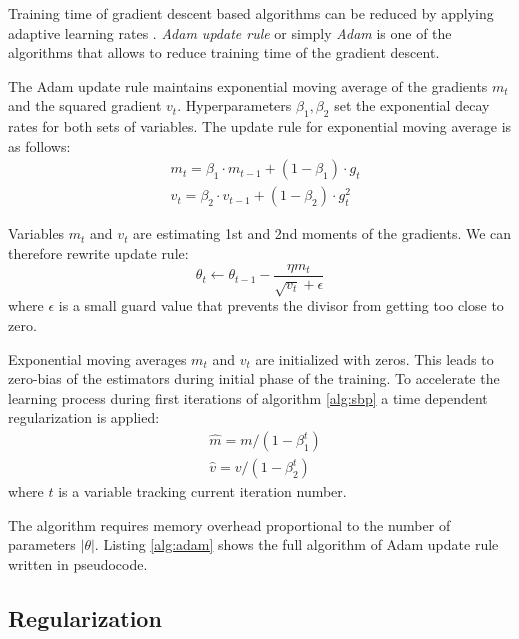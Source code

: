 Training time of gradient descent based algorithms can be reduced by applying adaptive learning rates \cite{Kingma2015}.
\textit{Adam update rule} or simply \textit{Adam} is one of the algorithms that allows to reduce training time of the gradient descent.

The Adam update rule maintains exponential moving average of the gradients $m_t$ and the squared gradient $v_t$.
Hyperparameters $\beta_1, \beta_2$ set the exponential decay rates for both sets of variables.
The update rule for exponential moving average is as follows:
\begin{equation*}
  \begin{aligned}
    & m_t = \beta_1 \cdot m_{t-1} + (1-\beta_1) \cdot g_t \\
    & v_t = \beta_2 \cdot v_{t-1} + (1-\beta_2) \cdot g_t^2
  \end{aligned}
\end{equation*}

Variables $m_t$ and $v_t$ are estimating 1st and 2nd moments of the gradients.
We can therefore rewrite update rule:
\begin{equation}
  \theta_t \gets \theta_{t-1} - \frac{\eta m_t}{\sqrt{v_t} + \epsilon}
\end{equation}
where $\epsilon$ is a small guard value that prevents the divisor from getting too close to zero.

Exponential moving averages $m_t$ and $v_t$ are initialized with zeros.
This leads to zero-bias of the estimators during initial phase of the training.
To accelerate the learning process during first iterations of algorithm \ref{alg:sbp} a time dependent regularization is applied:
\begin{equation*}
  \begin{aligned}
    & \hat{m} = m / (1-\beta_1^t) \\
    & \hat{v} = v/(1-\beta_2^t)
  \end{aligned}
\end{equation*}
where $t$ is a variable tracking current iteration number.

The algorithm requires memory overhead proportional to the number of parameters $|\theta|$. Listing \ref{alg:adam} shows the full algorithm of Adam update rule written in pseudocode.



\subsection{Regularization}

